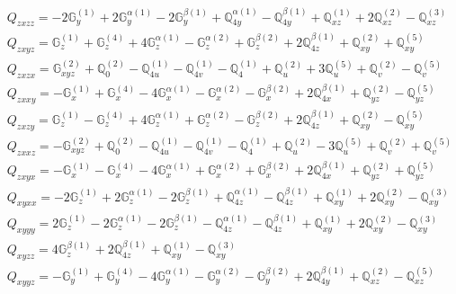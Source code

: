 \documentclass[fleqn,8pt,landscape]{jsarticle}
\begin{document}
\begin{align*}
& Q_{zxzz} = - 2 \mathbb{G}_{y}^{(1)} + 2 \mathbb{G}_{y}^{\alpha(1)} - 2 \mathbb{G}_{y}^{\beta(1)} + \mathbb{Q}_{4y}^{\alpha(1)} - \mathbb{Q}_{4y}^{\beta(1)} + \mathbb{Q}_{xz}^{(1)} + 2 \mathbb{Q}_{xz}^{(2)} - \mathbb{Q}_{xz}^{(3)} \\
& Q_{zxyz} = \mathbb{G}_{z}^{(1)} + \mathbb{G}_{z}^{(4)} + 4 \mathbb{G}_{z}^{\alpha(1)} - \mathbb{G}_{z}^{\alpha(2)} + \mathbb{G}_{z}^{\beta(2)} + 2 \mathbb{Q}_{4z}^{\beta(1)} + \mathbb{Q}_{xy}^{(2)} + \mathbb{Q}_{xy}^{(5)} \\
& Q_{zxzx} = \mathbb{G}_{xyz}^{(2)} + \mathbb{Q}_{0}^{(2)} - \mathbb{Q}_{4u}^{(1)} - \mathbb{Q}_{4v}^{(1)} - \mathbb{Q}_{4}^{(1)} + \mathbb{Q}_{u}^{(2)} + 3 \mathbb{Q}_{u}^{(5)} + \mathbb{Q}_{v}^{(2)} - \mathbb{Q}_{v}^{(5)} \\
& Q_{zxxy} = - \mathbb{G}_{x}^{(1)} + \mathbb{G}_{x}^{(4)} - 4 \mathbb{G}_{x}^{\alpha(1)} - \mathbb{G}_{x}^{\alpha(2)} - \mathbb{G}_{x}^{\beta(2)} + 2 \mathbb{Q}_{4x}^{\beta(1)} + \mathbb{Q}_{yz}^{(2)} - \mathbb{Q}_{yz}^{(5)} \\
& Q_{zxzy} = \mathbb{G}_{z}^{(1)} - \mathbb{G}_{z}^{(4)} + 4 \mathbb{G}_{z}^{\alpha(1)} + \mathbb{G}_{z}^{\alpha(2)} - \mathbb{G}_{z}^{\beta(2)} + 2 \mathbb{Q}_{4z}^{\beta(1)} + \mathbb{Q}_{xy}^{(2)} - \mathbb{Q}_{xy}^{(5)} \\
& Q_{zxxz} = - \mathbb{G}_{xyz}^{(2)} + \mathbb{Q}_{0}^{(2)} - \mathbb{Q}_{4u}^{(1)} - \mathbb{Q}_{4v}^{(1)} - \mathbb{Q}_{4}^{(1)} + \mathbb{Q}_{u}^{(2)} - 3 \mathbb{Q}_{u}^{(5)} + \mathbb{Q}_{v}^{(2)} + \mathbb{Q}_{v}^{(5)} \\
& Q_{zxyx} = - \mathbb{G}_{x}^{(1)} - \mathbb{G}_{x}^{(4)} - 4 \mathbb{G}_{x}^{\alpha(1)} + \mathbb{G}_{x}^{\alpha(2)} + \mathbb{G}_{x}^{\beta(2)} + 2 \mathbb{Q}_{4x}^{\beta(1)} + \mathbb{Q}_{yz}^{(2)} + \mathbb{Q}_{yz}^{(5)} \\
& Q_{xyxx} = - 2 \mathbb{G}_{z}^{(1)} + 2 \mathbb{G}_{z}^{\alpha(1)} - 2 \mathbb{G}_{z}^{\beta(1)} + \mathbb{Q}_{4z}^{\alpha(1)} - \mathbb{Q}_{4z}^{\beta(1)} + \mathbb{Q}_{xy}^{(1)} + 2 \mathbb{Q}_{xy}^{(2)} - \mathbb{Q}_{xy}^{(3)} \\
& Q_{xyyy} = 2 \mathbb{G}_{z}^{(1)} - 2 \mathbb{G}_{z}^{\alpha(1)} - 2 \mathbb{G}_{z}^{\beta(1)} - \mathbb{Q}_{4z}^{\alpha(1)} - \mathbb{Q}_{4z}^{\beta(1)} + \mathbb{Q}_{xy}^{(1)} + 2 \mathbb{Q}_{xy}^{(2)} - \mathbb{Q}_{xy}^{(3)} \\
& Q_{xyzz} = 4 \mathbb{G}_{z}^{\beta(1)} + 2 \mathbb{Q}_{4z}^{\beta(1)} + \mathbb{Q}_{xy}^{(1)} - \mathbb{Q}_{xy}^{(3)} \\
& Q_{xyyz} = - \mathbb{G}_{y}^{(1)} + \mathbb{G}_{y}^{(4)} - 4 \mathbb{G}_{y}^{\alpha(1)} - \mathbb{G}_{y}^{\alpha(2)} - \mathbb{G}_{y}^{\beta(2)} + 2 \mathbb{Q}_{4y}^{\beta(1)} + \mathbb{Q}_{xz}^{(2)} - \mathbb{Q}_{xz}^{(5)} \\

\end{align*}
\end{document}
